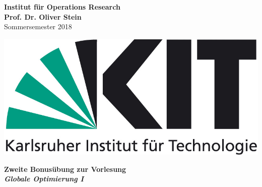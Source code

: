 \documentclass[ngerman, a4paper,12pt]{article}
\begin{document}
\begin{flushleft}
\vspace*{-100pt}
\textbf{Institut f\"ur Operations Research \\
Prof. Dr. Oliver Stein \\}
Sommersemester 2018
\vspace*{15pt}
\end{flushleft}

\begin{flushright}
\vspace*{-80pt}
\includegraphics[scale=0.5]{kit_logo}
\vspace*{15pt}
\end{flushright}

\begin{center}
\textbf{Zweite Bonusübung zur Vorlesung \\
\emph{Globale Optimierung I}}        
\end{center}
\end{document}
